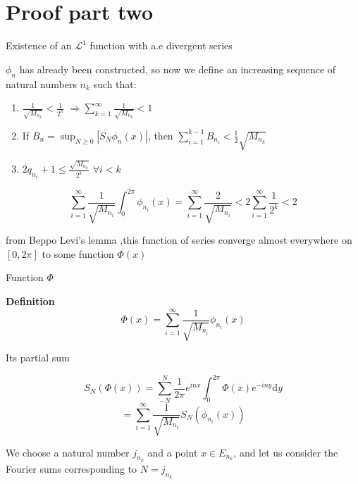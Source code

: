 \documentclass{beamer}
\begin{document}
\section{Proof part two}
\begin{frame}{Existence of an $ \mathcal{L}^1  $  function with a.e divergent series}
    
$ \phi_n $ has already been constructed, so now we define an increasing sequence of natural numbers $ n_k $ such that:
\begin{enumerate}
    \item $ \frac{1}{\sqrt{M_{n_k}}}<\frac{1}{2^k} $  $\Rightarrow \sum_{k=1}^{\infty}\frac{1}{\sqrt{M_{n_k}}}< 1 $ 
    \item If $ B_n = \sup_{N \geqslant 0}|S_N\phi_n(x)|$, then $ \sum_{i=1}^{k-1}B_{n_i}<\frac{1}{2}\sqrt{M_{n_k}} $
    \item $ 2q_{n_i}+1 \leqslant \frac{\sqrt{M_{n_k}}}{2^k} $ $ \forall i < k  $
\end{enumerate} 

\begin{block}{}
    \[ \sum_{i=1}^{\infty}\frac{1}{\sqrt{M_{n_i}}}\int_{0}^{2\pi}\phi_{n_i} (x) = \sum_{i=1}^{\infty}\frac{2}{\sqrt{M_{n_i}}}<2\sum_{i=1}^{\infty}\frac{1}{2^k} < 2\]
\end{block}
from Beppo Levi’s lemma ,this function of series converge almost everywhere on $ [0,2\pi] $ to some function $ \Phi(x) $

\end{frame}


\begin{frame}{Function $\Phi$}

    \begin{block}{\textbf{Definition}} 
        \[ \Phi(x)= \sum_{i=1}^{\infty}\frac{1}{\sqrt{M_{n_i}}}\phi_{n_i} (x)\]
    \end{block}

    Its partial sum 
    \begin{block}{}
        

    \[ S_N(\Phi(x))=\sum_{-N}^{N}\frac{1}{2\pi}e^{inx}\int_{0}^{2\pi}\Phi(x)e^{-iny}\mathrm{d}y  \]
    \[ =\sum_{i=1}^{\infty}\frac{1}{\sqrt{M_{n_i}}}S_N(\phi_{n_i}(x))\]
\end{block}
We choose a natural number $ j_{n_k} $ and a point $ x\in E_{n_k} $, and let us consider the Fourier sums corresponding to $ N=j_{n_k} $

\end{frame}
\end{document}
